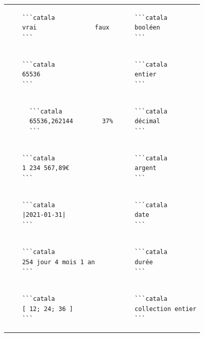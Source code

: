 \documentclass{article}
\makeatletter
\newenvironment{catala}{%
  \VerbatimEnvironment
  \let\FV@ListVSpace\relax
  \begin{verbatim}}%
 {\end{verbatim}}
\makeatother
\begin{document}
\begin{multicols}{3}
\begin{tabular}{@{}p{\cola}p{\colb}@{}}
  \begin{catala}
    ```catala
    vrai                faux
    ```
  \end{catala}
  & \begin{catala}
    ```catala
    booléen
    ```
  \end{catala}
  \\
  \begin{catala}
    ```catala
    65536
    ```
  \end{catala}
  & \begin{catala}
    ```catala
    entier
    ```
  \end{catala}
  \\
  \begin{catala}
      ```catala
      65536,262144        37%
      ```
    \end{catala}
  & \begin{catala}
    ```catala
    décimal
    ```
  \end{catala}
  \\
  \begin{catala}
    ```catala
    1 234 567,89€
    ```
  \end{catala}
  & \begin{catala}
    ```catala
    argent
    ```
  \end{catala}

  \\
  
  \begin{catala}
    ```catala
    |2021-01-31|
    ```
  \end{catala}
  & \begin{catala}
    ```catala
    date
    ```
  \end{catala}

  \\
  
  \begin{catala}
    ```catala
    254 jour 4 mois 1 an
    ```
  \end{catala}
  & \begin{catala}
    ```catala
    durée
    ```
  \end{catala}

  \\
  
  \begin{catala}
    ```catala
    [ 12; 24; 36 ]
    ```
  \end{catala}
  & \begin{catala}
    ```catala
    collection entier
    ```
  \end{catala}


\end{tabular}
\end{multicols}
\end{document}
